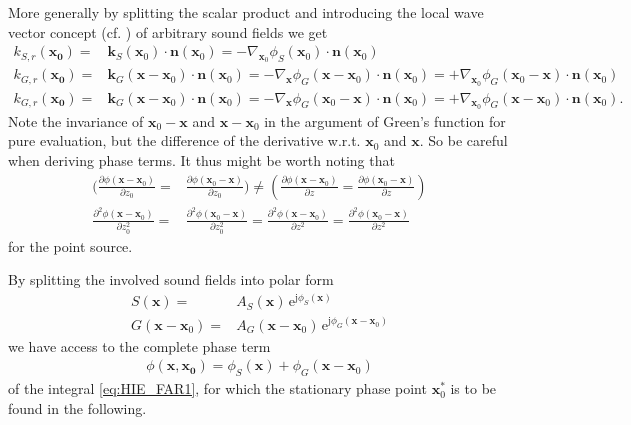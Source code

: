 \documentclass[a4paper,BCOR=15mm,10pt,twoside]{scrartcl}
\newcommand\e{\mathrm{e}}  %
\newcommand\im{\mathrm{j}}  %
\renewcommand{\vec}[1]{\mathbf{#1}}  %
\newcommand\unitn{\vec{n}}  %
\begin{document}
%
More generally by splitting the scalar product and introducing the local wave vector concept (cf. \cite[Sec. 3.1.1]{Firtha2018Diss}) of arbitrary sound fields we get
\begin{align}
\label{eq:kSrkGr}
k_{S,r}(\vec{x_0}) =& \vec{k}_S(\vec{x}_0) \cdot \unitn(\vec{x}_0) = - \nabla_{\vec{x}_0}\phi_S(\vec{x}_0) \cdot \unitn(\vec{x}_0)\\
k_{G,r}(\vec{x_0}) =& \vec{k}_G(\vec{x}-\vec{x}_0) \cdot \unitn(\vec{x}_0) = -\nabla_\vec{x}\phi_G(\vec{x}-\vec{x}_0) \cdot \unitn(\vec{x}_0) = + \nabla_{\vec{x}_0} \phi_G(\vec{x}_0-\vec{x}) \cdot \unitn(\vec{x}_0)\\
k_{G,r}(\vec{x_0}) =& \vec{k}_G(\vec{x}-\vec{x}_0) \cdot \unitn(\vec{x}_0) = -\nabla_\vec{x}\phi_G(\vec{x}_0-\vec{x}) \cdot \unitn(\vec{x}_0) = + \nabla_{\vec{x}_0} \phi_G(\vec{x}-\vec{x}_0) \cdot \unitn(\vec{x}_0).
\end{align}
Note the invariance of $\vec{x}_0-\vec{x}$ and $\vec{x}-\vec{x}_0$ in the argument of Green's function for pure evaluation, but the difference of the derivative w.r.t. $\vec{x}_0$ and $\vec{x}$. So be careful when deriving phase terms.
It thus might be worth noting that
\begin{align}
\label{eq:PntSrcDerivEqualities}
(\frac{\partial \phi(\vec{x}-\vec{x}_0)}{\partial z_0} = & \frac{\partial \phi(\vec{x}_0-\vec{x})}{\partial z_0}) \neq
(\frac{\partial \phi(\vec{x}-\vec{x}_0)}{\partial z} = \frac{\partial \phi(\vec{x}_0-\vec{x})}{\partial z})
\\
\frac{\partial^2 \phi(\vec{x}-\vec{x}_0)}{\partial z_0^2} =& \frac{\partial^2 \phi(\vec{x}_0-\vec{x})}{\partial z_0^2} = \frac{\partial^2 \phi(\vec{x}-\vec{x}_0)}{\partial z^2} = \frac{\partial^2 \phi(\vec{x}_0-\vec{x})}{\partial z^2}\nonumber
\end{align} 
for the point source.
%

By splitting the involved sound fields into polar form
\begin{align}
S(\vec{x}) =& A_S(\vec{x}) \, \e^{\im \phi_S(\vec{x})}\\
G(\vec{x}-\vec{x}_0) =& A_G(\vec{x}-\vec{x}_0) \, \e^{\im \phi_G(\vec{x}-\vec{x}_0)}
\end{align}
%
we have access to the complete phase term
%
\begin{align}
\phi(\vec{x}, \vec{x_0}) = \phi_{S}(\vec{x})  + \phi_{G}(\vec{x}-\vec{x}_0)
\end{align}
%
 of the integral \eqref{eq:HIE_FAR1}, for which the stationary phase point $\vec{x}_0^*$ is to be found in the following.
\end{document}
